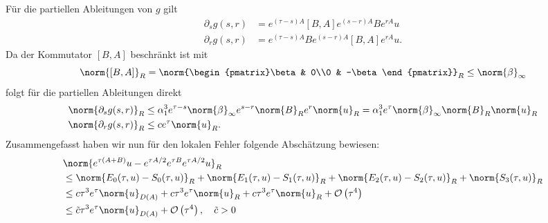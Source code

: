 Für die partiellen Ableitungen von $g$ gilt
\begin{align*}
\partial_sg(s,r)&=e^{(\tau-s)A}[B,A]e^{(s-r)A}Be^{rA}u\\
\partial_rg(s,r)&=e^{(\tau-s)A}Be^{(s-r)A}[B,A]e^{rA}u.
\end{align*}
Da der Kommutator $[B,A]$ beschränkt ist mit
\[\norm{[B,A]}_R=\norm{\begin{pmatrix}\beta & 0\\0 & -\beta\end{pmatrix}}_R\le \norm{\beta}_\infty\]
folgt für die partiellen Ableitungen direkt
\begin{align*}
\norm{\partial_sg(s,r)}_R&\le \alpha_1^3 e^{\tau-s}\norm{\beta}_\infty e^{s-r}\norm{B}_R e^r\norm{u}_R=\alpha_1^3e^\tau\norm{\beta}_\infty\norm{B}_R\norm{u}_R\\
\norm{\partial_rg(s,r)}_R&\le ce^\tau \norm{u}_R.
\end{align*}
Zusammengefasst haben wir nun für den lokalen Fehler folgende Abschätzung bewiesen:
\begin{align*}
&\norm{e^{\tau(A+B)}u-e^{\tau A/2}e^{\tau B}e^{\tau A/2}u}_R\\
&\le\norm{E_0(\tau,u)-S_0(\tau,u)}_R
+\norm{E_1(\tau,u)-S_1(\tau,u)}_R
+\norm{E_2(\tau,u)-S_2(\tau,u)}_R
+\norm{S_3(\tau,u)}_R\\
&\le c\tau^3e^\tau\norm{u}_{D(A)}+c\tau^3e^\tau\norm{u}_R+c\tau^3e^\tau\norm{u}_R+\mathcal{O}\left(\tau^4\right)\\
&\le \tilde{c}\tau^3e^\tau \norm{u}_{D(A)}+\mathcal{O}\left(\tau^4\right),\quad \tilde{c}>0
\end{align*}
